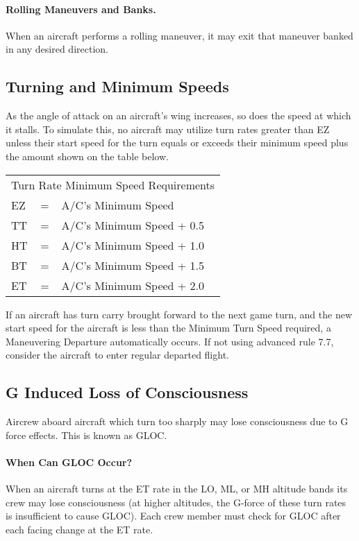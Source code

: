 \paragraph{Rolling Maneuvers and Banks.} When an aircraft performs a rolling maneuver, it may exit that maneuver banked in any desired direction.

\subsection{Turning and Minimum Speeds}

As the angle of attack on an aircraft's wing increases, so does the speed at which it stalls. To simulate this, no aircraft may utilize turn rates greater than EZ unless their start speed for the turn equals or exceeds their minimum speed plus the amount shown on the table below.

\begin{tabular}{lll}
\multicolumn{3}{c}{Turn Rate Minimum Speed Requirements}\\
 EZ &=& A/C's Minimum Speed\\
 TT &=& A/C's Minimum Speed + 0.5\\
 HT &=& A/C's Minimum Speed + 1.0\\
 BT &=& A/C's Minimum Speed + 1.5\\ 
 ET &=& A/C's Minimum Speed + 2.0\\
 \end{tabular}

If an aircraft has turn carry brought forward to the next game turn, and the new start speed for the aircraft is less than the Minimum Turn Speed required, a Maneuvering Departure automatically occurs. If not using advanced rule 7.7, consider the aircraft to enter regular departed flight.

\subsection{G Induced Loss of Consciousness}

Aircrew aboard aircraft which turn too sharply may lose consciousness due to G force effects. This is known as GLOC.

\paragraph{When Can GLOC Occur?} When an aircraft turns at the ET rate in the LO, ML, or MH altitude bands its crew may lose consciousness (at higher altitudes, the G-force of these turn rates is insufficient to cause GLOC). Each crew member must check for GLOC after each facing change at the ET rate.


